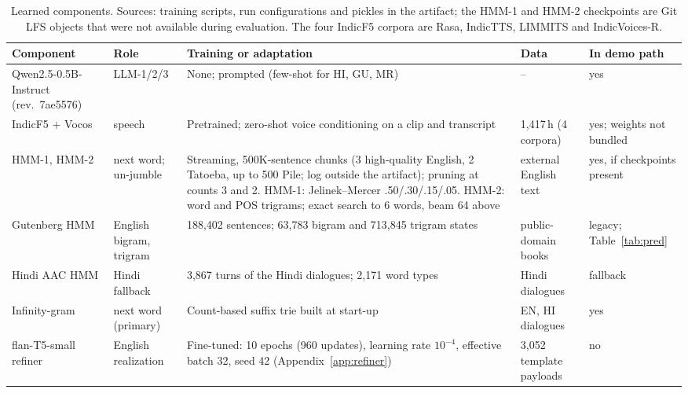 \begin{table}[t]
\centering\footnotesize
\setlength{\tabcolsep}{3pt}
\begin{tabular}{@{}L{2.6cm}L{2.1cm}L{6.2cm}L{2.0cm}L{1.7cm}@{}}
\toprule
Component & Role & Training or adaptation & Data & In demo path \\
\midrule
Qwen2.5-0.5B-Instruct (rev.\ 7ae5576) & LLM-1/2/3 & None; prompted (few-shot for HI, GU, MR) & -- & yes \\
IndicF5 + Vocos & speech & Pretrained; zero-shot voice conditioning on a clip and transcript & 1,417\,h (4 corpora) & yes; weights not bundled \\
HMM-1, HMM-2 & next word; un-jumble & Streaming, 500K-sentence chunks (3 high-quality English, 2 Tatoeba, up to 500 Pile; log outside the artifact); pruning at counts 3 and 2. HMM-1: Jelinek--Mercer .50/.30/.15/.05. HMM-2: word and POS trigrams; exact search to 6 words, beam 64 above & external English text & yes, if checkpoints present \\
Gutenberg HMM & English bigram, trigram & 188,402 sentences; 63,783 bigram and 713,845 trigram states & public-domain books & legacy; Table~\ref{tab:pred} \\
Hindi AAC HMM & Hindi fallback & 3,867 turns of the Hindi dialogues; 2,171 word types & Hindi dialogues & fallback \\
Infinity-gram & next word (primary) & Count-based suffix trie built at start-up & EN, HI dialogues & yes \\
flan-T5-small refiner & English realization & Fine-tuned: 10 epochs (960 updates), learning rate $10^{-4}$, effective batch 32, seed 42 (Appendix~\ref{app:refiner}) & 3,052 template payloads & no \\
\bottomrule
\end{tabular}
\caption{Learned components. Sources: training scripts, run configurations and pickles in the artifact; the HMM-1 and HMM-2 checkpoints are Git LFS objects that were not available during evaluation. The four IndicF5 corpora are Rasa, IndicTTS, LIMMITS and IndicVoices-R.}
\label{tab:models}
\end{table}
